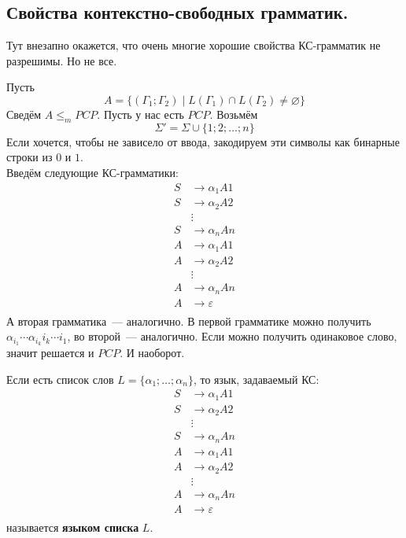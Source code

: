 \documentclass{article}
\begin{document}
    \subsection{Свойства контекстно-свободных грамматик.}
    \begin{remark}
        Тут внезапно окажется, что очень многие хорошие свойства КС-грамматик не разрешимы. Но не все.
    \end{remark}
    \begin{example}
        Пусть
        $$A=\{(\Gamma_1;\Gamma_2)\mid L(\Gamma_1)\cap L(\Gamma_2)\neq\varnothing\}$$
        Сведём $A\leqslant_mPCP$. Пусть у нас есть $PCP$. Возьмём
        $$
        \Sigma'=\Sigma\cup\{\boxed1;\boxed2;\ldots;\boxed n\}
        $$
        Если хочется, чтобы не зависело от ввода, закодируем эти символы как бинарные строки из $\boxed0$ и $\boxed1$.\\
        Введём следующие КС-грамматики:
        \begin{align*}
            S&\to\alpha_1 A\boxed1\\
            S&\to\alpha_2 A\boxed2\\
            &\vdots\\
            S&\to\alpha_n A\boxed n\\
            A&\to\alpha_1 A\boxed1\\
            A&\to\alpha_2 A\boxed2\\
            &\vdots\\
            A&\to\alpha_n A\boxed n\\
            A&\to\varepsilon\\
        \end{align*}
        А вторая грамматика~--- аналогично. В первой грамматике можно получить $\alpha_{i_1}\cdots\alpha_{i_k}\boxed{i_k}\cdots\boxed{i_1}$, во второй~--- аналогично. Если можно получить одинаковое слово, значит решается и $PCP$. И наоборот.
    \end{example}
    \begin{definition}
        Если есть список слов $L=\{\alpha_1;\ldots;\alpha_n\}$, то язык, задаваемый КС:
        \begin{align*}
            S&\to\alpha_1 A\boxed1\\
            S&\to\alpha_2 A\boxed2\\
            &\vdots\\
            S&\to\alpha_n A\boxed n\\
            A&\to\alpha_1 A\boxed1\\
            A&\to\alpha_2 A\boxed2\\
            &\vdots\\
            A&\to\alpha_n A\boxed n\\
            A&\to\varepsilon\\
        \end{align*}
        называется \textbf{языком списка} $L$.
    \end{definition}
\end{document}
